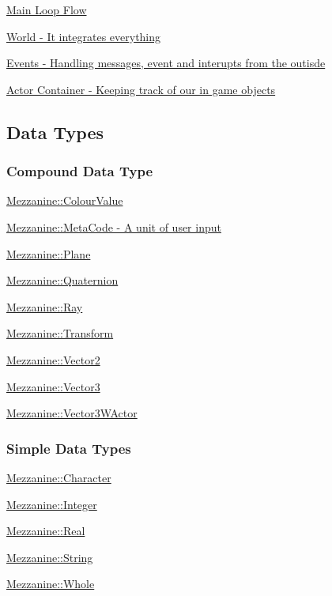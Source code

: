 \hyperlink{mainloop1}{Main Loop Flow}

\hyperlink{classMezzanine_1_1World}{World -\/ It integrates everything}

\hyperlink{classMezzanine_1_1EventManager}{Events -\/ Handling messages, event and interupts from the outisde}

\hyperlink{actorcontainer1}{Actor Container -\/ Keeping track of our in game objects}\hypertarget{index_Types}{}\subsection{Data Types}\label{index_Types}
\hypertarget{index_CompoundTypes}{}\subsubsection{Compound Data Type}\label{index_CompoundTypes}
\hyperlink{classMezzanine_1_1ColourValue}{Mezzanine::ColourValue}

\hyperlink{classMezzanine_1_1MetaCode}{Mezzanine::MetaCode -\/ A unit of user input}

\hyperlink{classMezzanine_1_1Plane}{Mezzanine::Plane}

\hyperlink{classMezzanine_1_1Quaternion}{Mezzanine::Quaternion}

\hyperlink{classMezzanine_1_1Ray}{Mezzanine::Ray}

\hyperlink{classMezzanine_1_1Transform}{Mezzanine::Transform}

\hyperlink{classMezzanine_1_1Vector2}{Mezzanine::Vector2}

\hyperlink{classMezzanine_1_1Vector3}{Mezzanine::Vector3}

\hyperlink{classMezzanine_1_1Vector3WActor}{Mezzanine::Vector3WActor}\hypertarget{index_SimpleDataTypes}{}\subsubsection{Simple Data Types}\label{index_SimpleDataTypes}
\hyperlink{namespaceMezzanine_ad5147a419db7627ee552a2b582f1052d}{Mezzanine::Character}

\hyperlink{namespaceMezzanine_ac3576e52af3c62d13dde94829e0c5465}{Mezzanine::Integer}

\hyperlink{namespaceMezzanine_a726731b1a7df72bf3583e4a97282c6f6}{Mezzanine::Real}

\hyperlink{namespaceMezzanine_acf9fcc130e6ebf08e3d8491aebcf1c86}{Mezzanine::String}

\hyperlink{namespaceMezzanine_adcbb6ce6d1eb4379d109e51171e2e493}{Mezzanine::Whole}

